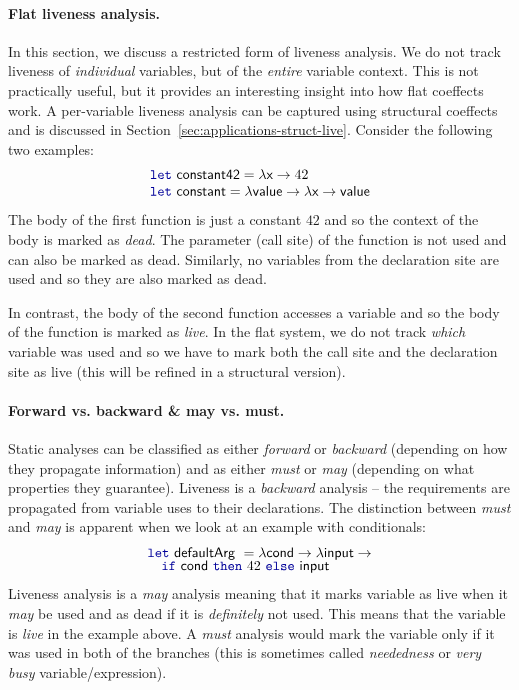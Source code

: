 \paragraph{Flat liveness analysis.}
In this section, we discuss a restricted form of liveness analysis. We do not track liveness of
\emph{individual} variables, but of the \emph{entire} variable context. This is not practically
useful, but it provides an interesting insight into how flat coeffects work. A per-variable liveness
analysis can be captured using structural coeffects and is discussed in Section~\ref{sec:applications-struct-live}.
Consider the following two examples:
%
\begin{equation*}
\begin{array}{l}
\kvd{let}~\ident{constant42} = \lambda \ident{x} \rightarrow 42\\
\kvd{let}~\ident{constant} = \lambda \ident{value} \rightarrow \lambda \ident{x} \rightarrow \ident{value}
\end{array}
\end{equation*}
%
The body of the first function is just a constant $42$ and so the context of the body is marked
as \emph{dead}. The parameter (call site) of the function is not used and can also be marked as dead.
Similarly, no variables from the declaration site are used and so they are also marked as dead.

In contrast, the body of the second function accesses a variable  and so the body
of the function is marked as \emph{live}. In the flat system, we do not track \emph{which}
variable was used and so we have to mark both the call site and the declaration site as live (this will
be refined in a structural version).

\paragraph{Forward vs. backward \& may vs. must.}
Static analyses can be classified as either \emph{forward} or \emph{backward} (depending on how they
propagate information) and as either \emph{must} or \emph{may} (depending on what properties they
guarantee). Liveness is a \emph{backward} analysis -- the requirements are propagated from variable
uses to their declarations. The distinction between \emph{must} and \emph{may} is apparent when we look
at an example with conditionals:
%
\begin{equation*}
\begin{array}{l}
\kvd{let}~\ident{defaultArg}~= \lambda \ident{cond} \rightarrow \lambda \ident{input} \rightarrow\\[-0.25em]
\quad\kvd{if}~\ident{cond}~\kvd{then}~42~\kvd{else}~\ident{input}
\end{array}
\end{equation*}
%
Liveness analysis is a \emph{may} analysis meaning that it marks variable as live when it
\emph{may} be used and as dead if it is \emph{definitely} not used. This means that the variable
 is \emph{live} in the example above. A \emph{must} analysis would mark the variable
only if it was used in both of the branches (this is sometimes called \emph{neededness} or
\emph{very busy} variable/expression).

